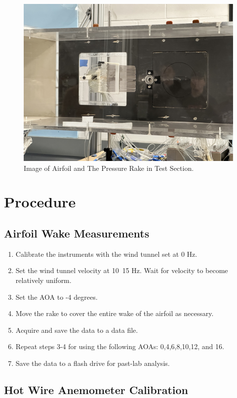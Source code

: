 \begin{figure}[htpb]
    \centering
    \includegraphics[width=0.75\linewidth]{Figures/IMG_3196.jpeg}
    \caption[Image of Airfoil and The Pressure Rake in Test Section.]{Image of Airfoil and The Pressure Rake in Test Section.}
    \label{fig: AirFoilAndPressureRake}
\end{figure}

\newpage
\section{Procedure}\label{sec:procedures}
\subsection{Airfoil Wake Measurements}
\begin{enumerate}
\item Calibrate the instruments with the wind tunnel set at 0 Hz.
\item Set the wind tunnel velocity at 10~15 Hz. Wait for velocity to become relatively uniform. 
\item Set the AOA to -4 degrees. 
\item Move the rake to cover the entire wake of the airfoil as necessary.
\item Acquire and save the data to a data file.
\item Repeat steps 3-4 for using the following AOAs: 0,4,6,8,10,12, and 16.
\item Save the data to a flash drive for past-lab analysis.
\end{enumerate}

\subsection{Hot Wire Anemometer Calibration}

